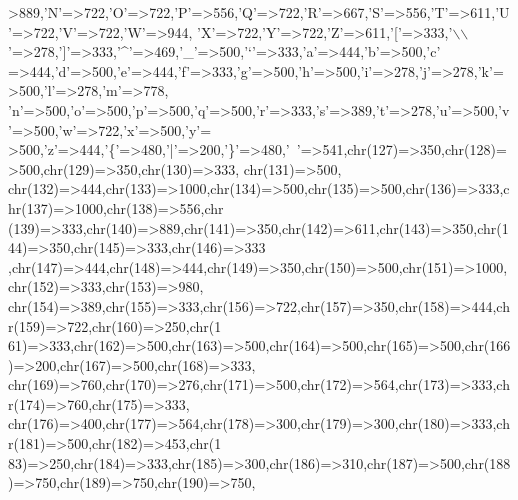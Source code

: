 \begin{DoxyCode}
{      >889,\textcolor{charliteral}{'N'}=>722,\textcolor{charliteral}{'O'}=>722,\textcolor{charliteral}{'P'}=>556,\textcolor{charliteral}{'Q'}=>722,\textcolor{charliteral}{'R'}=>667,\textcolor{charliteral}{'S'}=>556,\textcolor{charliteral}{'T'}=>611,\textcolor{charliteral}{'U'}=>722,\textcolor{charliteral}{'V'}=>722,\textcolor{charliteral}{'W'}=>944,
    \textcolor{charliteral}{'X'}=>722,\textcolor{charliteral}{'Y'}=>722,\textcolor{charliteral}{'Z'}=>611,\textcolor{charliteral}{'['}=>333,\textcolor{charliteral}{'\(\backslash\)\(\backslash\)'}=>278,\textcolor{charliteral}{']'}=>333,\textcolor{charliteral}{'^'}=>469,\textcolor{charliteral}{'\_'}=>500,\textcolor{charliteral}{'`'}=>333,\textcolor{charliteral}{'a'}=>444,\textcolor{charliteral}{'b'}=>500,\textcolor{charliteral}{'c'}
      =>444,\textcolor{charliteral}{'d'}=>500,\textcolor{charliteral}{'e'}=>444,\textcolor{charliteral}{'f'}=>333,\textcolor{charliteral}{'g'}=>500,\textcolor{charliteral}{'h'}=>500,\textcolor{charliteral}{'i'}=>278,\textcolor{charliteral}{'j'}=>278,\textcolor{charliteral}{'k'}=>500,\textcolor{charliteral}{'l'}=>278,\textcolor{charliteral}{'m'}=>778,
    \textcolor{charliteral}{'n'}=>500,\textcolor{charliteral}{'o'}=>500,\textcolor{charliteral}{'p'}=>500,\textcolor{charliteral}{'q'}=>500,\textcolor{charliteral}{'r'}=>333,\textcolor{charliteral}{'s'}=>389,\textcolor{charliteral}{'t'}=>278,\textcolor{charliteral}{'u'}=>500,\textcolor{charliteral}{'v'}=>500,\textcolor{charliteral}{'w'}=>722,\textcolor{charliteral}{'x'}=>500,\textcolor{charliteral}{'y'}=
      >500,\textcolor{charliteral}{'z'}=>444,\textcolor{charliteral}{'\{'}=>480,\textcolor{charliteral}{'|'}=>200,\textcolor{charliteral}{'\}'}=>480,\textcolor{charliteral}{'~'}=>541,chr(127)=>350,chr(128)=>500,chr(129)=>350,chr(130)=>333,
      chr(131)=>500,
    chr(132)=>444,chr(133)=>1000,chr(134)=>500,chr(135)=>500,chr(136)=>333,chr(137)=>1000,chr(138)=>556,chr
      (139)=>333,chr(140)=>889,chr(141)=>350,chr(142)=>611,chr(143)=>350,chr(144)=>350,chr(145)=>333,chr(146)=>333
      ,chr(147)=>444,chr(148)=>444,chr(149)=>350,chr(150)=>500,chr(151)=>1000,chr(152)=>333,chr(153)=>980,
    chr(154)=>389,chr(155)=>333,chr(156)=>722,chr(157)=>350,chr(158)=>444,chr(159)=>722,chr(160)=>250,chr(1
      61)=>333,chr(162)=>500,chr(163)=>500,chr(164)=>500,chr(165)=>500,chr(166)=>200,chr(167)=>500,chr(168)=>333,
      chr(169)=>760,chr(170)=>276,chr(171)=>500,chr(172)=>564,chr(173)=>333,chr(174)=>760,chr(175)=>333,
    chr(176)=>400,chr(177)=>564,chr(178)=>300,chr(179)=>300,chr(180)=>333,chr(181)=>500,chr(182)=>453,chr(1
      83)=>250,chr(184)=>333,chr(185)=>300,chr(186)=>310,chr(187)=>500,chr(188)=>750,chr(189)=>750,chr(190)=>750,
}
\end{DoxyCode}
